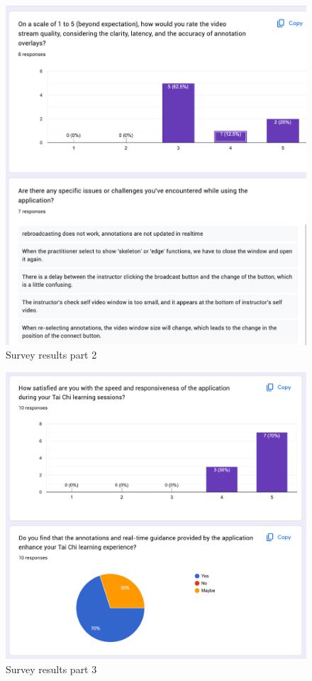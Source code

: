\documentclass[12pt, titlepage]{article}
\begin{document}
\begin{figure}[!]
  \centering
  \includegraphics[width=1.0\linewidth]{surveyp2.png}
  \caption{Survey results part 2}
  \label{fig:surveyp2}
\end{figure}

\begin{figure}[!]
  \centering
  \includegraphics[width=1.0\linewidth]{surveyp3.png}
  \caption{Survey results part 3}
  \label{fig:surveyp3}
\end{figure}
\end{document}
